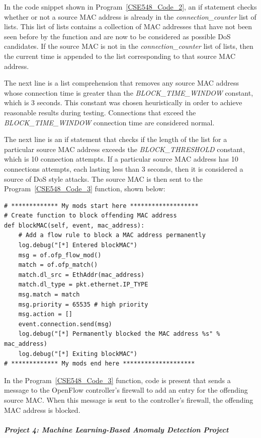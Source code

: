 In the code snippet shown in Program~\ref{CSE548_Code_2}, an if statement checks whether or not a source MAC address is already in the \textit{connection\_counter} list of lists.  This list of lists contains a collection of MAC addresses that have not been seen before by the function and are now to be considered as possible DoS candidates.  If the source MAC is not in the \textit{connection\_counter} list of lists, then the current time is appended to the list corresponding to that source MAC address.

The next line is a list comprehension that removes any source MAC address whose connection time is greater than the \textit{BLOCK\_TIME\_WINDOW} constant, which is 3 seconds.  This constant was chosen heuristically in order to achieve reasonable results during testing.  Connections that exceed the  \textit{BLOCK\_TIME\_WINDOW} connection time are considered normal.

The next line is an if statement that checks if the length of the list for a particular source MAC address exceeds the \textit{BLOCK\_THRESHOLD} constant, which is 10 connection attempts.  If a particular source MAC address has 10 connections attempts, each lasting less than 3 seconds, then it is considered a source of DoS style attacks.  The source MAC is then sent to the Program~\ref{CSE548_Code_3} function, shown below:

\begin{verbatim}
# ************* My mods start here *******************
# Create function to block offending MAC address
def blockMAC(self, event, mac_address):
    # Add a flow rule to block a MAC address permanently
    log.debug("[*] Entered blockMAC")
    msg = of.ofp_flow_mod()
    match = of.ofp_match()
    match.dl_src = EthAddr(mac_address)
    match.dl_type = pkt.ethernet.IP_TYPE
    msg.match = match
    msg.priority = 65535 # high priority
    msg.action = []
    event.connection.send(msg)
    log.debug("[*] Permanently blocked the MAC address %s" % mac_address)
    log.debug("[*] Exiting blockMAC")
# ************* My mods end here ********************
\end{verbatim}

In the Program~\ref{CSE548_Code_3} function, code is present that sends a message to the OpenFlow controller's firewall to add an entry for the offending source MAC.  When this message is sent to the controller's firewall, the offending MAC address is blocked.

\subparagraph{Project 4: Machine Learning-Based Anomaly Detection Project}

